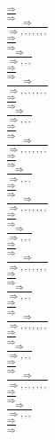 \documentclass[11pt]{article}
\begin{document}
\begin{center}
\bigskip
\\$\frac{\Rightarrow }{\Rightarrow }$
\bigskip
\\$\frac{\Rightarrow }{\Rightarrow , , , , , , , }$
\bigskip
\\$\frac{\Rightarrow }{\Rightarrow }$
\bigskip
\\$\frac{\Rightarrow }{\Rightarrow , , , }$
\bigskip
\\$\frac{\Rightarrow }{\Rightarrow }$
\bigskip
\\$\frac{\Rightarrow }{\Rightarrow , , , , , , , }$
\bigskip
\\$\frac{\Rightarrow }{\Rightarrow }$
\bigskip
\\$\frac{\Rightarrow }{\Rightarrow , , , }$
\bigskip
\\$\frac{\Rightarrow }{\Rightarrow }$
\bigskip
\\$\frac{\Rightarrow }{\Rightarrow , , , , , , , }$
\bigskip
\\$\frac{\Rightarrow }{\Rightarrow }$
\bigskip
\\$\frac{\Rightarrow }{\Rightarrow , , , }$
\bigskip
\\$\frac{\Rightarrow }{\Rightarrow }$
\bigskip
\\$\frac{\Rightarrow }{\Rightarrow , , , , , , , }$
\bigskip
\\$\frac{\Rightarrow }{\Rightarrow }$
\bigskip
\\$\frac{\Rightarrow }{\Rightarrow , , , }$
\bigskip
\\$\frac{\Rightarrow }{\Rightarrow }$
\bigskip
\\$\frac{\Rightarrow }{\Rightarrow , , , , , , , }$
\bigskip
\\$\frac{\Rightarrow }{\Rightarrow }$
\bigskip
\\$\frac{\Rightarrow }{\Rightarrow , , , }$
\bigskip
\\$\frac{\Rightarrow }{\Rightarrow }$
\bigskip
\\$\frac{\Rightarrow }{\Rightarrow , , , , , , , }$
\bigskip
\\$\frac{\Rightarrow }{\Rightarrow }$
\bigskip
\\$\frac{\Rightarrow }{\Rightarrow , , , }$
\bigskip
\\$\frac{\Rightarrow }{\Rightarrow }$
\bigskip
\\$\frac{\Rightarrow }{\Rightarrow , , , , , , , }$
\bigskip
\\$\frac{\Rightarrow }{\Rightarrow }$
\bigskip
\\$\frac{\Rightarrow }{\Rightarrow , , , }$
\bigskip
\\$\frac{\Rightarrow }{\Rightarrow }$

\end{center}
\end{document}
